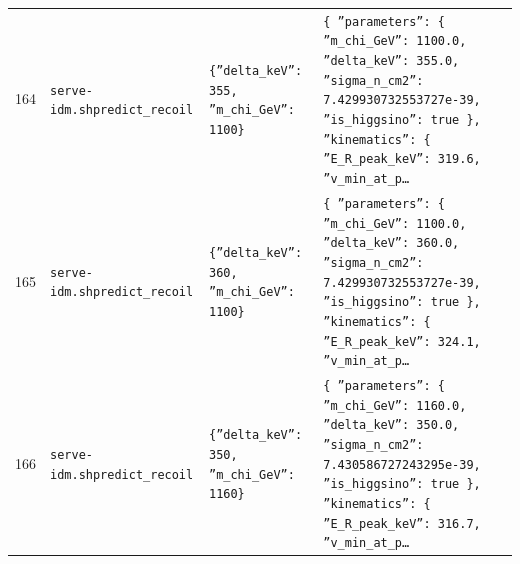 \documentclass[11pt,a4paper]{article}
\begin{document}
\begin{longtable}{@{}p{}p{}p{}p{}@{}}
164 & \texttt{serve-idm.sh}\newline\texttt{predict\_\allowbreak{}recoil} & \texttt{\{''delta\_\allowbreak{}keV'':\allowbreak{} 355,\allowbreak{} ''m\_\allowbreak{}chi\_\allowbreak{}GeV'':\allowbreak{} 1100\}\allowbreak{}} & \texttt{\{   ''parameters'':\allowbreak{} \{     ''m\_\allowbreak{}chi\_\allowbreak{}GeV'':\allowbreak{} 1100.0,\allowbreak{}     ''delta\_\allowbreak{}keV'':\allowbreak{} 355.0,\allowbreak{}     ''sigma\_\allowbreak{}n\_\allowbreak{}cm2'':\allowbreak{} 7.429930732553727e-39,\allowbreak{}     ''is\_\allowbreak{}higgsino'':\allowbreak{} true   \}\allowbreak{},\allowbreak{}   ''kinematics'':\allowbreak{} \{     ''E\_\allowbreak{}R\_\allowbreak{}peak\_\allowbreak{}keV'':\allowbreak{} 319.6,\allowbreak{}     ''v\_\allowbreak{}min\_\allowbreak{}at\_\allowbreak{}p\ldots{}\allowbreak{}} \\
165 & \texttt{serve-idm.sh}\newline\texttt{predict\_\allowbreak{}recoil} & \texttt{\{''delta\_\allowbreak{}keV'':\allowbreak{} 360,\allowbreak{} ''m\_\allowbreak{}chi\_\allowbreak{}GeV'':\allowbreak{} 1100\}\allowbreak{}} & \texttt{\{   ''parameters'':\allowbreak{} \{     ''m\_\allowbreak{}chi\_\allowbreak{}GeV'':\allowbreak{} 1100.0,\allowbreak{}     ''delta\_\allowbreak{}keV'':\allowbreak{} 360.0,\allowbreak{}     ''sigma\_\allowbreak{}n\_\allowbreak{}cm2'':\allowbreak{} 7.429930732553727e-39,\allowbreak{}     ''is\_\allowbreak{}higgsino'':\allowbreak{} true   \}\allowbreak{},\allowbreak{}   ''kinematics'':\allowbreak{} \{     ''E\_\allowbreak{}R\_\allowbreak{}peak\_\allowbreak{}keV'':\allowbreak{} 324.1,\allowbreak{}     ''v\_\allowbreak{}min\_\allowbreak{}at\_\allowbreak{}p\ldots{}\allowbreak{}} \\
166 & \texttt{serve-idm.sh}\newline\texttt{predict\_\allowbreak{}recoil} & \texttt{\{''delta\_\allowbreak{}keV'':\allowbreak{} 350,\allowbreak{} ''m\_\allowbreak{}chi\_\allowbreak{}GeV'':\allowbreak{} 1160\}\allowbreak{}} & \texttt{\{   ''parameters'':\allowbreak{} \{     ''m\_\allowbreak{}chi\_\allowbreak{}GeV'':\allowbreak{} 1160.0,\allowbreak{}     ''delta\_\allowbreak{}keV'':\allowbreak{} 350.0,\allowbreak{}     ''sigma\_\allowbreak{}n\_\allowbreak{}cm2'':\allowbreak{} 7.430586727243295e-39,\allowbreak{}     ''is\_\allowbreak{}higgsino'':\allowbreak{} true   \}\allowbreak{},\allowbreak{}   ''kinematics'':\allowbreak{} \{     ''E\_\allowbreak{}R\_\allowbreak{}peak\_\allowbreak{}keV'':\allowbreak{} 316.7,\allowbreak{}     ''v\_\allowbreak{}min\_\allowbreak{}at\_\allowbreak{}p\ldots{}\allowbreak{}} \\

\end{longtable}
\end{document}
